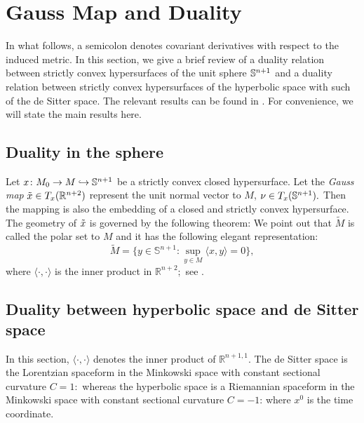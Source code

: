 \section{Gauss Map and Duality}\label{Duality}
\label{gauss_duality}
In what follows, a semicolon denotes covariant derivatives with respect to the induced metric.
In this section, we give a brief review of a duality relation between strictly convex hypersurfaces of the unit sphere $\S^{n+1}$ and a duality relation between strictly convex hypersurfaces of the hyperbolic space with such of the de Sitter space. The relevant results can be found in \cite[Ch.~9, 10]{Gerhardt:/2006}. For convenience, we will state the main results here.
\subsection{Duality in the sphere}
Let $x\cn M_0\ra M\hra \S^{n+1}$ be a strictly convex closed hypersurface. Let the {\it{Gauss map}} $\~x\in T_x(\R^{n+2})$ represent the unit normal vector to $M$, $\nu\in T_x(\S^{n+1}).$ Then the mapping
is also the embedding of a closed and strictly convex hypersurface. The geometry of $\~x$ is governed by the following theorem:
We point out that $\tilde{M}$ is called the polar set to $M$ and it has the following elegant representation:
$$\tilde{M}=\{y\in \mathbb{S}^{n+1}: \sup_{y\in M}\langle x,y\rangle=0\},$$
where $\langle \cdot,\cdot\rangle$ is the inner product in $\mathbb{R}^{n+2};$ see \cite[Thm.~9.2.9]{Gerhardt:/2006}.
\subsection{Duality between hyperbolic space and de Sitter space} In this section, $\langle \cdot,\cdot\rangle$ denotes the inner product of $\mathbb{R}^{n+1,1}.$
The de Sitter space is the Lorentzian spaceform in the Minkowski space with constant sectional curvature $C=1:$
whereas the hyperbolic space is a Riemannian spaceform in the Minkowski space with constant sectional curvature $C=-1$:
where $x^0$ is the time coordinate.

